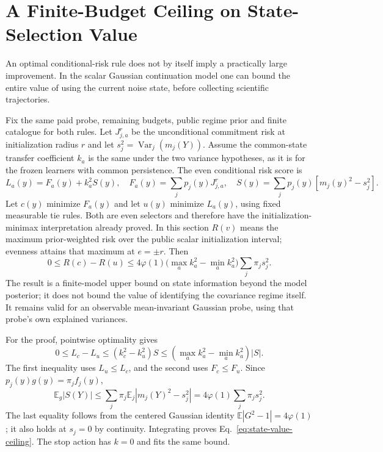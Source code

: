 \section{A Finite-Budget Ceiling on State-Selection Value}
An optimal conditional-risk rule does not by itself imply a practically large improvement.
In the scalar Gaussian continuation model one can bound the entire value of using the current noise state, before collecting scientific trajectories.

Fix the same paid probe, remaining budgets, public regime prior and finite catalogue for both rules.
Let $J_{j,a}^{r}$ be the unconditional commitment risk at initialization radius $r$ and let $s_j^2=\operatorname{Var}_j(m_j(Y))$.
Assume the common-state transfer coefficient $k_a$ is the same under the two variance hypotheses, as it is for the frozen learners with common persistence.
The even conditional risk score is
\[
L_a(y)=F_a(y)+k_a^2S(y),\quad
F_a(y)=\sum_jp_j(y)J_{j,a}^{r},\quad
S(y)=\sum_jp_j(y)[m_j(y)^2-s_j^2].
\]
Let $c(y)$ minimize $F_a(y)$ and let $u(y)$ minimize $L_a(y)$, using fixed measurable tie rules.
Both are even selectors and therefore have the initialization-minimax interpretation already proved.
In this section $R(v)$ means the maximum prior-weighted risk over the public scalar initialization interval; evenness attains that maximum at $e=\pm r$.
Then
\begin{equation}
0\le R(c)-R(u)
\le4\varphi(1)\bigl(\max_a k_a^2-\min_a k_a^2\bigr)
\sum_j\pi_js_j^2.
\label{eq:state-value-ceiling}
\end{equation}
The result is a finite-model upper bound on state information beyond the model posterior; it does not bound the value of identifying the covariance regime itself.
It remains valid for an observable mean-invariant Gaussian probe, using that probe's own explained variances.

For the proof, pointwise optimality gives
\[
0\le L_c-L_u\le (k_c^2-k_u^2)S
\le(\max_a k_a^2-\min_a k_a^2)|S|.
\]
The first inequality uses $L_u\le L_c$, and the second uses $F_c\le F_u$.
Since $p_j(y)g(y)=\pi_jf_j(y)$,
\[
\mathbb E_g|S(Y)|\le\sum_j\pi_j\mathbb E_j|m_j(Y)^2-s_j^2|
=4\varphi(1)\sum_j\pi_js_j^2.
\]
The last equality follows from the centered Gaussian identity $\mathbb E|G^2-1|=4\varphi(1)$; it also holds at $s_j=0$ by continuity.
Integrating proves Eq.~\eqref{eq:state-value-ceiling}.
The stop action has $k=0$ and fits the same bound.

